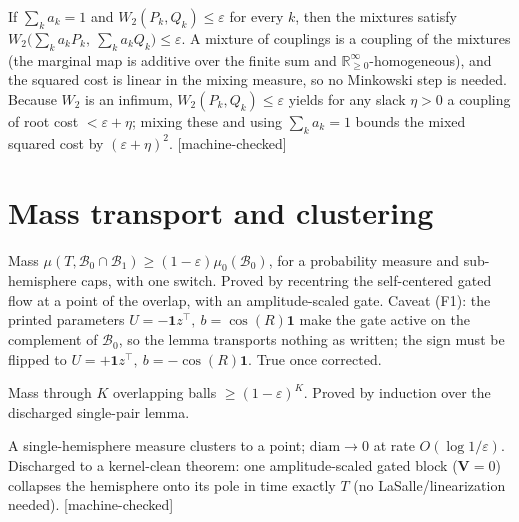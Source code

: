 \begin{lemma}\label{found:w2conv}\leanok
If $\sum_k a_k = 1$ and $W_2(P_k,Q_k)\le\varepsilon$ for every $k$, then the mixtures satisfy
$W_2\big(\sum_k a_k P_k,\ \sum_k a_k Q_k\big)\le\varepsilon$. A mixture of couplings is a coupling of the
mixtures (the marginal map is additive over the finite sum and $\mathbb R_{\ge0}^\infty$-homogeneous),
and the squared cost is linear in the mixing measure, so no Minkowski step is needed. Because $W_2$ is
an infimum, $W_2(P_k,Q_k)\le\varepsilon$ yields for any slack $\eta>0$ a coupling of root cost
$<\varepsilon+\eta$; mixing these and using $\sum_k a_k = 1$ bounds the mixed squared cost by
$(\varepsilon+\eta)^2$. [machine-checked]
\end{lemma}

\section{Mass transport and clustering}

\begin{lemma}\label{lem:b2}\leanok
Mass $\mu(T,\mathcal B_0\cap\mathcal B_1)\ge(1-\varepsilon)\mu_0(\mathcal B_0)$, for a probability
measure and sub-hemisphere caps, with one switch. Proved by recentring the self-centered gated flow
at a point of the overlap, with an amplitude-scaled gate.
Caveat (F1): the printed parameters $U=-\mathbf 1 z^\top,\ b=\cos(R)\mathbf 1$ make the gate active on
the complement of $\mathcal B_0$, so the lemma transports nothing as written; the sign must be flipped
to $U=+\mathbf 1 z^\top,\ b=-\cos(R)\mathbf 1$. True once corrected.
\end{lemma}

\begin{lemma}\label{lem:b1}\leanok
Mass through $K$ overlapping balls $\ge(1-\varepsilon)^K$. Proved by induction over the discharged
single-pair lemma.
\end{lemma}

\begin{proposition}\label{prop:21}\leanok
A single-hemisphere measure clusters to a point; $\mathrm{diam}\to 0$ at rate $O(\log 1/\varepsilon)$.
Discharged to a kernel-clean theorem: one amplitude-scaled gated block ($\mathbf V=0$) collapses the
hemisphere onto its pole in time exactly $T$ (no LaSalle/linearization needed). [machine-checked]
\end{proposition}

